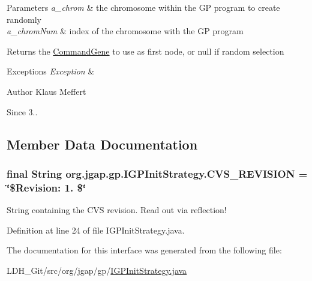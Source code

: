 \begin{DoxyParams}{Parameters}
{\em a\-\_\-chrom} & the chromosome within the G\-P program to create randomly \\
\hline
{\em a\-\_\-chrom\-Num} & index of the chromosome with the G\-P program \\
\hline
\end{DoxyParams}
\begin{DoxyReturn}{Returns}
the \hyperlink{classorg_1_1jgap_1_1gp_1_1_command_gene}{Command\-Gene} to use as first node, or null if random selection 
\end{DoxyReturn}

\begin{DoxyExceptions}{Exceptions}
{\em Exception} & \\
\hline
\end{DoxyExceptions}
\begin{DoxyAuthor}{Author}
Klaus Meffert 
\end{DoxyAuthor}
\begin{DoxySince}{Since}
3.. 
\end{DoxySince}


\subsection{Member Data Documentation}
\hypertarget{interfaceorg_1_1jgap_1_1gp_1_1_i_g_p_init_strategy_a56342cc354cb84eebbc63a7f2b071733}{
\subsubsection[{C\-V\-S\-\_\-\-R\-E\-V\-I\-S\-I\-O\-N}]{\setlength{\rightskip}{0pt plus 5cm}final String org.\-jgap.\-gp.\-I\-G\-P\-Init\-Strategy.\-C\-V\-S\-\_\-\-R\-E\-V\-I\-S\-I\-O\-N = \char`\"{}\$Revision\-: 1. \$\char`\"{}\hspace{0.3cm}{\ttfamily [static]}}}\label{interfaceorg_1_1jgap_1_1gp_1_1_i_g_p_init_strategy_a56342cc354cb84eebbc63a7f2b071733}
String containing the C\-V\-S revision. Read out via reflection! 

Definition at line 24 of file I\-G\-P\-Init\-Strategy.\-java.



The documentation for this interface was generated from the following file\-:\begin{DoxyCompactItemize}
\item 
L\-D\-H\-\_\-\-Git/src/org/jgap/gp/\hyperlink{_i_g_p_init_strategy_8java}{I\-G\-P\-Init\-Strategy.\-java}\end{DoxyCompactItemize}
